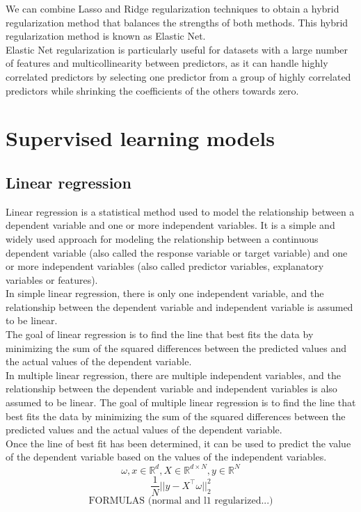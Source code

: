 \documentclass{article}
\newcommand{\R}{\mathbb{R}}
\begin{document}
We can combine Lasso and Ridge regularization techniques to obtain a hybrid regularization method that balances the strengths of both methods.
This hybrid regularization method is known as Elastic Net.\\
Elastic Net regularization is particularly useful for datasets with a large number of features and multicollinearity between predictors, as it can handle highly correlated predictors by selecting one predictor from a group of highly correlated predictors while shrinking the coefficients of the others towards zero.

\section{Supervised learning models}
\subsection{Linear regression}
Linear regression is a statistical method used to model the relationship between a dependent variable and one or more independent variables. It is a simple and widely used approach for modeling the relationship between a continuous dependent variable (also called the response variable or target variable) and one or more independent variables (also called predictor variables, explanatory variables or features).\\
In simple linear regression, there is only one independent variable, and the relationship between the dependent variable and independent variable is assumed to be linear.\\
The goal of linear regression is to find the line that best fits the data by minimizing the sum of the squared differences between the predicted values and the actual values of the dependent variable.\\
In multiple linear regression, there are multiple independent variables, and the relationship between the dependent variable and independent variables is also assumed to be linear. The goal of multiple linear regression is to find the line that best fits the data by minimizing the sum of the squared differences between the predicted values and the actual values of the dependent variable.\\
Once the line of best fit has been determined, it can be used to predict the value of the dependent variable based on the values of the independent variables.
\[\omega, x \in\R^d, X\in\R^{d\times N}, y\in\R^N\]
\[\frac{1}{N} ||y-X^\intercal\omega||_2^2\]
\[\text{FORMULAS (normal and l1 regularized...)}\]
\end{document}

